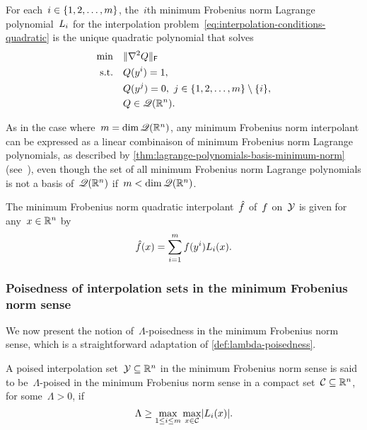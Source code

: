 \begin{definition}
    \label{def:lagrange-polynomials-minimum-norm}
    For each~$i \in \{1, 2, \dots, m\}$, the~$i$th minimum Frobenius norm Lagrange polynomial~$\lagp[i]$ for the interpolation problem~\cref{eq:interpolation-conditions-quadratic} is the unique quadratic polynomial that solves
    \begin{align*}
        \min        & \quad \lVert\nabla^2 Q\rVert_{\mathsf{F}}\\
        \text{s.t.} & \quad Q(y^i) = 1,\\
                    & \quad Q(y^j) = 0, ~ j \in \{1, 2, \dots, m\} \setminus \{i\},\\
                    & \quad Q \in \mathscr{Q}(\mathbb{R}^n).
    \end{align*}
\end{definition}

As in the case where~$m = \dim \mathscr{Q}(\mathbb{R}^n)$, any minimum Frobenius norm interpolant can be expressed as a linear combinaison of minimum Frobenius norm Lagrange polynomials, as described by \cref{thm:lagrange-polynomials-basis-minimum-norm} (see~\cite[\S~3]{Powell_2004b}), even though the set of all minimum Frobenius norm Lagrange polynomials is not a basis of~$\mathscr{Q}(\mathbb{R}^n)$ if~$m < \dim \mathscr{Q}(\mathbb{R}^n)$.

\begin{theorem}
    \label{thm:lagrange-polynomials-basis-minimum-norm}
    The minimum Frobenius norm quadratic interpolant~$\objm$ of~$f$ on~$\xpt$ is given for any~$\iter \in \R^n$ by
    \begin{equation*}
        \objm(\iter) = \sum_{i = 1}^m \obj(y^i) \lagp[i](\iter).
    \end{equation*}
\end{theorem}

\subsubsection{Poisedness of interpolation sets in the minimum Frobenius norm sense}

We now present the notion of~$\Lambda$-poisedness in the minimum Frobenius norm sense, which is a straightforward adaptation of \cref{def:lambda-poisedness}.

\begin{definition}
    \label{def:lambda-poisedness-minimum-norm}
    A poised interpolation set~$\xpt \subseteq \R^n$ in the minimum Frobenius norm sense is said to be~$\Lambda$-poised in the minimum Frobenius norm sense in a compact set~$\mathcal{C} \subseteq \mathbb{R}^n$, for some~$\Lambda > 0$, if
    \begin{equation*}
        \Lambda \ge \max_{1 \le i \le m} \max_{\iter \in \mathcal{C}} \abs{\lagp[i](\iter)}.
    \end{equation*}
\end{definition}

